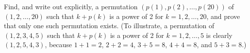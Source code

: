 Find, and write out explicitly, a permutation $(p(1), p(2), \dots, p(20))$ of
$(1, 2, \dots, 20)$ such that $k + p(k)$ is a power of 2 for $k = 1, 2, \dots,
20$, and prove that only one such permutation exists. (To illustrate, a
permutation of $(1, 2, 3, 4, 5)$ such that $k + p(k)$ is a power of 2 for $k =
1, 2, \dots, 5$ is clearly $(1, 2, 5, 4, 3)$, because $1 + 1 = 2$, $2 + 2 = 4$,
$3 + 5 = 8$, $4 + 4 = 8$, and $5 + 3 = 8$.)
